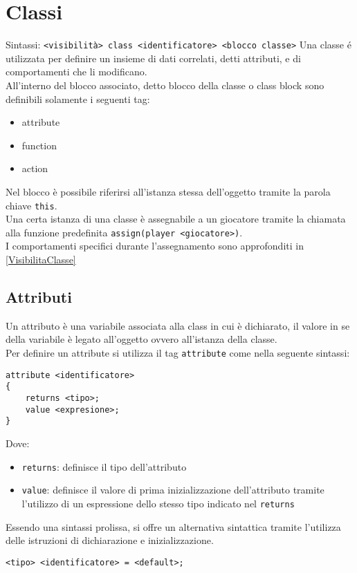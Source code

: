 \section{Classi}
Sintassi: \verb|<visibilità> class <identificatore> <blocco classe>|
Una classe é utilizzata per definire un insieme di dati correlati, detti attributi, e di 
comportamenti che li modificano. \\
All'interno del blocco associato, detto blocco della classe o class block sono definibili
solamente i seguenti tag:
\begin{itemize}
    \item attribute
    \item function
    \item action
\end{itemize}
Nel blocco è possibile riferirsi all'istanza stessa dell'oggetto tramite la parola chiave \verb|this|. \\
Una certa istanza di una classe è assegnabile a un giocatore tramite la chiamata alla funzione predefinita \verb|assign(player <giocatore>)|. \\
I comportamenti specifici durante l'assegnamento sono approfonditi in \ref*{VisibilitaClasse}

\subsection{Attributi}
Un attributo è una variabile associata alla class in cui è dichiarato, il valore in se della 
variabile è legato all'oggetto ovvero all'istanza della classe. \\
Per definire un attribute si utilizza il tag \verb|attribute| come nella seguente sintassi:
\begin{lstlisting}
attribute <identificatore>
{
    returns <tipo>;     
    value <expresione>;
}
\end{lstlisting}
Dove:
\begin{itemize}
    \item \verb|returns|: definisce il tipo dell'attributo
    \item \verb|value|: definisce il valore di prima inizializzazione dell'attributo tramite 
    l'utilizzo di un espressione dello stesso tipo indicato nel \verb|returns|
\end{itemize}
Essendo una sintassi prolissa, si offre un alternativa sintattica tramite l'utilizza
delle istruzioni di dichiarazione e inizializzazione.
\begin{lstlisting}
<tipo> <identificatore> = <default>; 
\end{lstlisting}

